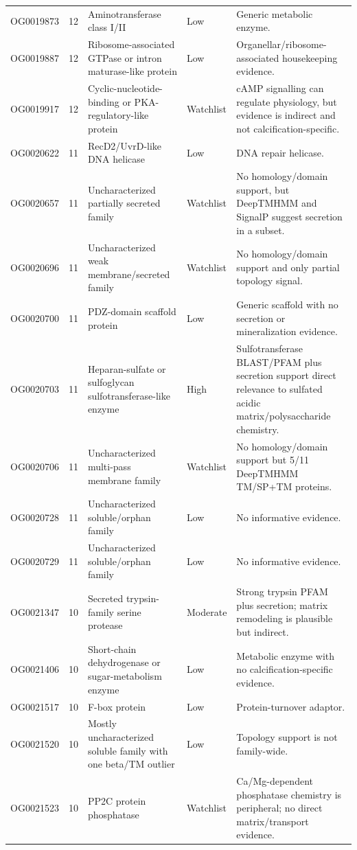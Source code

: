 \begin{longtable}{p{1.9cm}r p{4.55cm}p{1.8cm}p{5.55cm}}
OG0019873 & 12 & Aminotransferase class I/II & Low & Generic metabolic enzyme.\\
OG0019887 & 12 & Ribosome-associated GTPase or intron maturase-like protein & Low & Organellar/ribosome-associated housekeeping evidence.\\
OG0019917 & 12 & Cyclic-nucleotide-binding or PKA-regulatory-like protein & Watchlist & cAMP signalling can regulate physiology, but evidence is indirect and not calcification-specific.\\
OG0020622 & 11 & RecD2/UvrD-like DNA helicase & Low & DNA repair helicase.\\
OG0020657 & 11 & Uncharacterized partially secreted family & Watchlist & No homology/domain support, but DeepTMHMM and SignalP suggest secretion in a subset.\\
OG0020696 & 11 & Uncharacterized weak membrane/secreted family & Watchlist & No homology/domain support and only partial topology signal.\\
OG0020700 & 11 & PDZ-domain scaffold protein & Low & Generic scaffold with no secretion or mineralization evidence.\\
OG0020703 & 11 & Heparan-sulfate or sulfoglycan sulfotransferase-like enzyme & High & Sulfotransferase BLAST/PFAM plus secretion support direct relevance to sulfated acidic matrix/polysaccharide chemistry.\\
OG0020706 & 11 & Uncharacterized multi-pass membrane family & Watchlist & No homology/domain support but 5/11 DeepTMHMM TM/SP+TM proteins.\\
OG0020728 & 11 & Uncharacterized soluble/orphan family & Low & No informative evidence.\\
OG0020729 & 11 & Uncharacterized soluble/orphan family & Low & No informative evidence.\\
OG0021347 & 10 & Secreted trypsin-family serine protease & Moderate & Strong trypsin PFAM plus secretion; matrix remodeling is plausible but indirect.\\
OG0021406 & 10 & Short-chain dehydrogenase or sugar-metabolism enzyme & Low & Metabolic enzyme with no calcification-specific evidence.\\
OG0021517 & 10 & F-box protein & Low & Protein-turnover adaptor.\\
OG0021520 & 10 & Mostly uncharacterized soluble family with one beta/TM outlier & Low & Topology support is not family-wide.\\
OG0021523 & 10 & PP2C protein phosphatase & Watchlist & Ca/Mg-dependent phosphatase chemistry is peripheral; no direct matrix/transport evidence.\\

\end{longtable}
